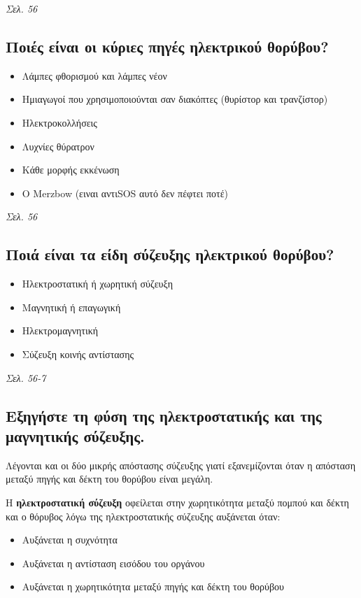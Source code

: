 \documentclass{article}
\begin{document}
\emph{Σελ. 56}

\subsection{Ποιές είναι οι κύριες πηγές ηλεκτρικού θορύβου?}
\begin{itemize}
    \item Λάμπες φθορισμού και λάμπες νέον
    \item Ημιαγωγοί που χρησιμοποιούνται σαν διακόπτες (θυρίστορ και τρανζίστορ)
    \item Ηλεκτροκολλήσεις
    \item Λυχνίες θύρατρον
    \item Κάθε μορφής εκκένωση
    \item O \foreignlanguage{english}{Merzbow} (ειναι αντι\foreignlanguage{english}{SOS} αυτό δεν πέφτει ποτέ)
\end{itemize}

\emph{Σελ. 56}

\subsection{Ποιά είναι τα είδη σύζευξης ηλεκτρικού θορύβου?}
\begin{itemize}
    \item Ηλεκτροστατική ή χωρητική σύζευξη
    \item Μαγνητική ή επαγωγική
    \item Ηλεκτρομαγνητική
    \item Σύζευξη κοινής αντίστασης
\end{itemize}

\emph{Σελ. 56-7}

\subsection{Εξηγήστε τη φύση της ηλεκτροστατικής και της μαγνητικής \linebreak σύζευξης.}
Λέγονται και οι δύο μικρής απόστασης σύζευξης γιατί εξανεμίζονται όταν η απόσταση μεταξύ πηγής και δέκτη του θορύβου είναι μεγάλη.

Η \textbf{ηλεκτροστατική σύζευξη} οφείλεται στην χωρητικότητα μεταξύ πομπού και δέκτη και ο θόρυβος λόγω της ηλεκτροστατικής σύζευξης αυξάνεται όταν:
\begin{itemize}
    \item Αυξάνεται η συχνότητα
    \item Aυξάνεται η αντίσταση εισόδου του οργάνου
    \item Αυξάνεται η χωρητικότητα μεταξύ πηγής και δέκτη του θορύβου
\end{itemize}
\end{document}

